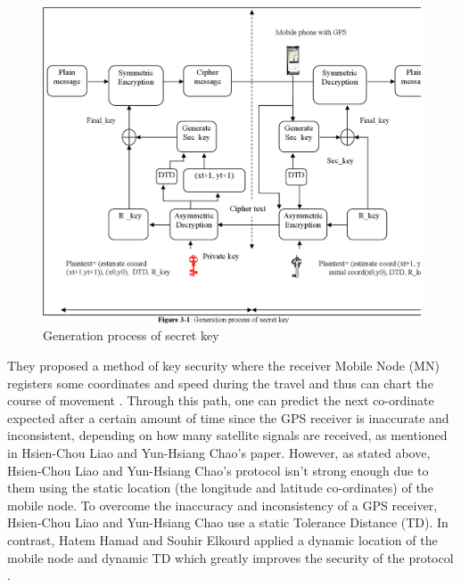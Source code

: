 \documentclass[journal]{IEEEtran}
\begin{document}
\newline
\begin{figure}[!h]
    \centering
    \includegraphics[scale=.1]{37-Figure3-1-1}
    \caption{Generation process of secret key}
    \label{fig:gpsk}
\end{figure}


They proposed a method of key security where the receiver Mobile Node (MN) registers some coordinates and speed during the travel and thus can chart the course of movement \cite{encryption_mobile_node}. Through this path, one can predict the next co-ordinate expected after a certain amount of time since the GPS receiver is inaccurate and inconsistent, depending on how many satellite signals are received, as mentioned in Hsien-Chou Liao and Yun-Hsiang Chao's paper. However, as stated above, Hsien-Chou Liao and Yun-Hsiang Chao's protocol isn't strong enough due to them using the static location (the longitude and latitude co-ordinates) of the mobile node. To overcome the inaccuracy and inconsistency of a GPS receiver, Hsien-Chou Liao and Yun-Hsiang Chao use a static Tolerance Distance (TD). In contrast, Hatem Hamad and Souhir Elkourd applied a dynamic location of the mobile node and dynamic TD which greatly improves the security of the protocol \cite{encryption_mobile_node}.
\end{document}
